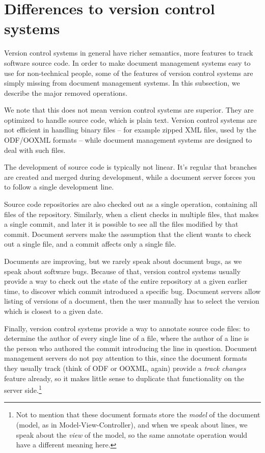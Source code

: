 \section{Differences to version control systems}

Version control systems in general have richer semantics, more features to
track software source code. In order to make document management systems easy
to use for non-technical people, some of the features of version control
systems are simply missing from document management systems. In this
subsection, we describe the major removed operations.

We note that this does not mean version control systems are superior. They are
optimized to handle source code, which is plain text. Version control systems
are not efficient in handling binary files -- for example zipped XML files, used by
the ODF/OOXML formats -- while document management systems are designed to deal
with such files.

The development of source code is typically not linear. It's regular that
branches are created and merged during development, while a document server
forces you to follow a single development line.

Source code repositories are also checked out as a single operation,
containing all files of the repository. Similarly, when a client checks in
multiple files, that makes a single commit, and later it is possible to see all
the files modified by that commit. Document servers make the assumption that
the client wants to check out a single file, and a commit affects only a single
file.

Documents are improving, but we rarely speak about document bugs, as we speak
about software bugs. Because of that, version control systems usually provide a
way to check out the state of the entire repository at a given earlier
time, to discover which commit introduced a specific bug. Document servers
allow listing of versions of a document, then the user manually has to select
the version which is closest to a given date.

Finally, version control systems provide a way to annotate source code files:
to determine the author of every single line of a file, where the author of a
line is the person who authored the commit introducing the line in question.
Document management servers do not pay attention to this, since the document
formats they usually track (think of ODF or OOXML, again) provide a \emph{track
changes} feature already, so it makes little sense to duplicate that
functionality on the server side.\footnote{Not to mention that these document
formats store the \emph{model} of the document (model, as in
Model-View-Controller), and when we speak about lines, we speak about the
\emph{view} of the model, so the same annotate operation would have a different
meaning here.}

